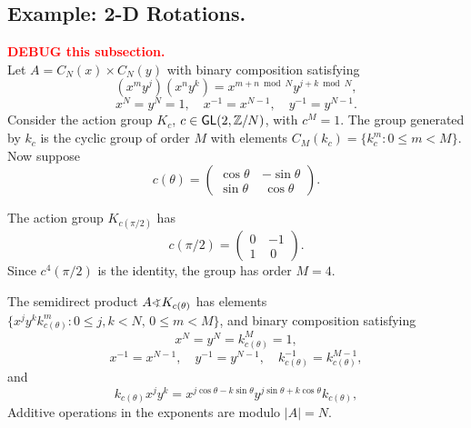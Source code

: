 \subsection{Example: 2-D Rotations.} \textcolor{red}{\bf DEBUG this subsection.}\\

Let $A = C_N(x) \times C_N(y)$ with binary composition satisfying
\[
(x^my^j)(x^ny^k) = x^{m+n \bmod N}y^{j+k \bmod N},
\]
\[
x^N = y^N = 1, \quad x^{-1} = x^{N-1}, \quad y^{-1}= y^{N-1}.
\]
Consider the action group $K_c$, $c\in \mathsf{GL}(2,\mathbb{Z}/N)$,
with $c^M=1$.
The group generated by $k_c$ is the cyclic group of order
$M$ with elements $C_M(k_c) = \{k_c^m : 0 \leq m < M\}$.
Now suppose
\[
c(\theta) = \begin{pmatrix} \cos \theta \, &  -\sin \theta \\ 
                    \sin \theta \, & \, \cos \theta \end{pmatrix}.
\]
\begin{example}[Rotation by $\pi/2$]
The action group $K_{c(\pi/2)}$ has
\[
c(\pi/2) = \begin{pmatrix} 0\, & -1\\ 
                            1\, & \, 0 \end{pmatrix}.
\]
Since $c^4(\pi/2)$ is the identity, the group
has order $M=4$.
\end{example}

The semidirect product $A\varangle K_{c(\theta)}$ has elements
$\{x^j y^k k_{c(\theta)}^m : 0 \leq j,k < N,\, 0 \leq m < M\}$,
and binary composition satisfying
\[
x^N = y^N = k_{c(\theta)}^M = 1,
\]
\[
x^{-1} = x^{N-1}, \quad y^{-1}= y^{N-1}, \quad k_{c(\theta)}^{-1} = k_{c(\theta)}^{M-1},
\]
and
\[
k_{c(\theta)} x^j y^k = x^{j \cos \theta - k \sin \theta} y^{j \sin
  \theta + k \cos \theta} k_{c(\theta)},
\]
Additive operations in the exponents are modulo $|A|=N$.

